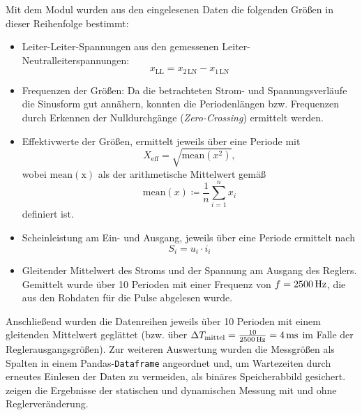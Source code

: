 Mit dem Modul wurden aus den eingelesenen Daten die folgenden Größen in dieser Reihenfolge bestimmt:
\begin{itemize}
    \item Leiter-Leiter-Spannungen aus den gemessenen Leiter-Neutralleiterspannungen: 
        \begin{equation}
        x_{\mathrm{LL}} = x_{\mathrm{2\,LN}} - x_{\mathrm{1\,LN}}
        \end{equation}
    \item Frequenzen der Größen: Da die betrachteten Strom- und Spannungsverläufe die Sinusform gut annähern, konnten die Periodenlängen bzw. Frequenzen durch Erkennen der Nulldurchgänge (\emph{Zero-Crossing}) ermittelt werden.
    \item Effektivwerte der Größen, ermittelt jeweils über eine Periode mit \begin{equation}
        X_{\mathrm{eff}}=\sqrt{\mathrm{mean}(x^2)},
    \end{equation}
    wobei $\mathrm{mean(x)}$ als der arithmetische Mittelwert gemäß \begin{equation}
        \mathrm{mean}(x) \coloneqq \frac{1}{n} \sum_{i=1}^n x_i
    \end{equation}
    definiert ist.
    \item Scheinleistung am Ein- und Ausgang, jeweils über eine Periode ermittelt nach \begin{equation}
        S_i = u_i \cdot i_i
    \end{equation}
    \item {Gleitender Mittelwert des Stroms und der Spannung am Ausgang des Reglers. Gemittelt wurde über 10 Perioden mit einer Frequenz von $f=\unit[2500]{Hz}$, die aus den Rohdaten für die Pulse abgelesen wurde.
    }
\end{itemize}
Anschließend wurden die Datenreihen jeweils über 10 Perioden mit einem gleitenden Mittelwert geglättet (bzw. über $\Delta T_{\mathrm{mittel}}=\frac{10}{\unit[2500]{Hz}}=\unit[4]{ms}$ im Falle der Reglerausgangsgrößen). Zur weiteren Auswertung wurden die Messgrößen als Spalten in einem Pandas-\texttt{Dataframe} angeordnet und, um Wartezeiten durch erneutes Einlesen der Daten zu vermeiden, als binäres Speicherabbild gesichert.  zeigen die Ergebnisse der statischen und dynamischen Messung mit und ohne Reglerveränderung.
